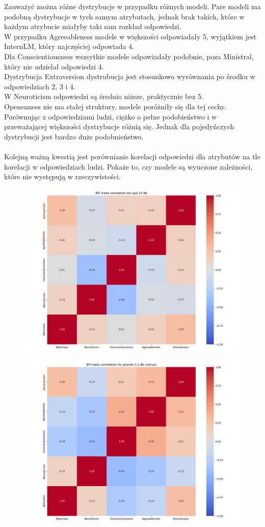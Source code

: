 \documentclass{article}
\begin{document}
Zauważyć można różne dystrybucje w przypadku różnych modeli. Pare modeli ma podobną dystrybucje w tych samym atrybutach, jednak brak takich, które w każdym atrybucie miałyby taki sam rozkład odpowiedzi. \\
W przypadku Agreeableness modele w większości odpowiadały 5, wyjątkiem jest InternLM, który najczęściej odpowiada 4. \\
Dla Conscientiousness wszsytkie modele odpowiadały podobnie, poza Ministral, który nie udzielał odpowiedzi 4. \\
Dystrybucja Extraversion dystrubucja jest stosunkowo wyrównania po środku w odpowiedziach 2, 3 i 4. \\
W Neuroticism odpowiedzi są średnio niższe, praktycznie bez 5. \\
Openenness nie ma stałej struktury, modele poróżniły się dla tej cechy. \\
Porównując z odpowiedziami ludzi, ciężko o pełne podobieństwo i w przeważającej większości dystrybucje różnią się.  Jednak dla pojedyńczych dystrybucji jest bardzo duże podobnieństwo.\\ \\ 

Kolejną ważną kwestią jest porównianie korelacji odpowiedzi dla atrybutów na tle korelacji w odpowiedziach ludzi. Pokaże to, czy modele są wyuczone zależności, które nie występują w rzeczywistości.

\begin{figure}[H]
    \centering
    \includegraphics[width=0.7 \linewidth]{../Prompt_code/plots/aya-23-8b/bfi_correlation.png}
\end{figure}

\begin{figure}[H]
    \centering
    \includegraphics[width=0.7 \linewidth]{../Prompt_code/plots/granite-3.3-8b-instruct/bfi_correlation.png}
\end{figure}
\end{document}
